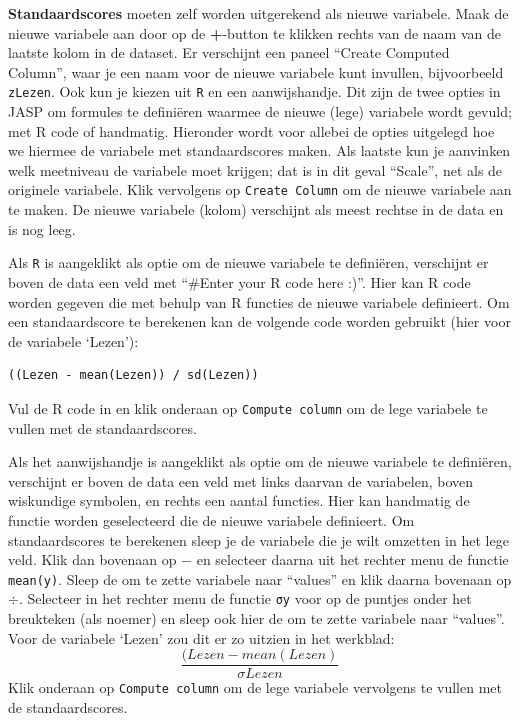 \documentclass[
]{book}
\begin{document}
\textbf{Standaardscores} moeten zelf worden uitgerekend als nieuwe variabele. Maak de nieuwe variabele aan door op de \textbf{+}-button te klikken rechts van de naam van de laatste kolom in de dataset. Er verschijnt een paneel ``Create Computed Column'', waar je een naam voor de nieuwe variabele kunt invullen, bijvoorbeeld \texttt{zLezen}. Ook kun je kiezen uit \texttt{R} en een aanwijshandje. Dit zijn de twee opties in JASP om formules te definiëren waarmee de nieuwe (lege) variabele wordt gevuld; met R code of handmatig. Hieronder wordt voor allebei de opties uitgelegd hoe we hiermee de variabele met standaardscores maken. Als laatste kun je aanvinken welk meetniveau de variabele moet krijgen; dat is in dit geval ``Scale'', net als de originele variabele. Klik vervolgens op \texttt{Create\ Column} om de nieuwe variabele aan te maken. De nieuwe variabele (kolom) verschijnt als meest rechtse in de data en is nog leeg.

Als \texttt{R} is aangeklikt als optie om de nieuwe variabele te definiëren, verschijnt er boven de data een veld met ``\#Enter your R code here :)''. Hier kan R code worden gegeven die met behulp van R functies de nieuwe variabele definieert. Om een standaardscore te berekenen kan de volgende code worden gebruikt (hier voor de variabele `Lezen'):

\begin{verbatim}
((Lezen - mean(Lezen)) / sd(Lezen))
\end{verbatim}

Vul de R code in en klik onderaan op \texttt{Compute\ column} om de lege variabele te vullen met de standaardscores.

Als het aanwijshandje is aangeklikt als optie om de nieuwe variabele te definiëren, verschijnt er boven de data een veld met links daarvan de variabelen, boven wiskundige symbolen, en rechts een aantal functies. Hier kan handmatig de functie worden geselecteerd die de nieuwe variabele definieert. Om standaardscores te berekenen sleep je de variabele die je wilt omzetten in het lege veld. Klik dan bovenaan op \(-\) en selecteer daarna uit het rechter menu de functie \texttt{mean(y)}. Sleep de om te zette variabele naar ``values'' en klik daarna bovenaan op \(\div\). Selecteer in het rechter menu de functie \texttt{σy} voor op de puntjes onder het breukteken (als noemer) en sleep ook hier de om te zette variabele naar ``values''. Voor de variabele `Lezen' zou dit er zo uitzien in het werkblad: \[\frac{(Lezen-mean(Lezen)}{\sigma Lezen}\]
Klik onderaan op \texttt{Compute\ column} om de lege variabele vervolgens te vullen met de standaardscores.
\end{document}
